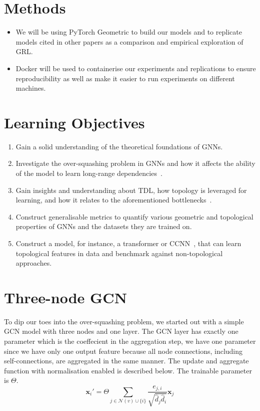 \documentclass[a4paper,12pt]{article}
\begin{document}
\section{Methods}
\begin{itemize}
	\item  We will be using PyTorch Geometric to build our models and to replicate models cited in other papers as a comparison and empirical exploration of GRL.
	\item Docker will be used to containerise our experiments and replications to ensure reproducibility as well as make it easier to run experiments on different machines.
\end{itemize}

\section{Learning Objectives}


\begin{enumerate}
	\item Gain a solid understanding of the theoretical foundations of GNNs.
	\item Investigate the over-squashing problem in GNNs and how it affects the ability of the model to learn long-range dependencies~\cite{alon_bottleneck_2021}.
	\item Gain insights and understanding about TDL, how topology is leveraged for learning, and how it relates to the aforementioned bottlenecks~\cite{horn_topological_2022}.
	\item Construct generalisable metrics to quantify various geometric and topological properties of GNNs and the datasets they are trained on.
	\item Construct a model, for instance, a transformer or CCNN~\cite{tdlbook}, that can learn topological features in data and benchmark against non-topological approaches.
\end{enumerate}


\section{Three-node GCN}

To dip our toes into the over-squashing problem,
we started out with a simple GCN model with three nodes and one layer.
The GCN layer has exactly one parameter which is the coeffecient in the aggregation step, we have one parameter since we have only one output feature because all node connections, including self-connections, are aggregated in the same manner.
The update and aggregate function with normalisation enabled is described below. The trainable parameter is \(\Theta\).
\begin{equation}
  \mathbf{x}_i' = \Theta \sum_{j \in \mathcal{N}(v) \cup \{i\}} \frac{e_{j,i}}{\sqrt{\hat{d}_j \hat{d}_i}} \mathbf{x}_j
\end{equation}
\end{document}
